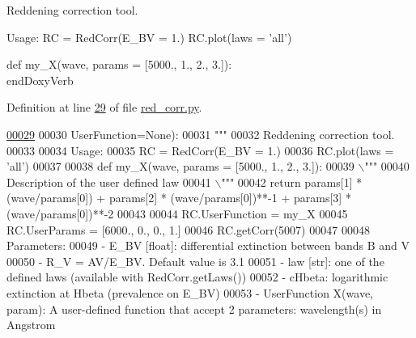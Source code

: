 \begin{DoxyVerb}Reddening correction tool.

Usage:
    RC = RedCorr(E_BV = 1.)
    RC.plot(laws = 'all')

    def my_X(wave, params = [5000., 1., 2., 3.]):
\\end{DoxyVerb}
 

Definition at line \hyperlink{red__corr_8py_source_l00029}{29} of file \hyperlink{red__corr_8py_source}{red\-\_\-corr.\-py}.


\begin{DoxyCode}
\hypertarget{classpyneb_1_1extinction_1_1red__corr_1_1_red_corr_l00029}{}\hyperlink{classpyneb_1_1extinction_1_1red__corr_1_1_red_corr_a27b836e3bd87558f6156a8bf94fbf658}{00029} 
00030                  UserFunction=\textcolor{keywordtype}{None}):
00031         \textcolor{stringliteral}{"""}
00032 \textcolor{stringliteral}{        Reddening correction tool.}
00033 \textcolor{stringliteral}{}
00034 \textcolor{stringliteral}{        Usage:}
00035 \textcolor{stringliteral}{            RC = RedCorr(E\_BV = 1.)}
00036 \textcolor{stringliteral}{            RC.plot(laws = 'all')}
00037 \textcolor{stringliteral}{}
00038 \textcolor{stringliteral}{            def my\_X(wave, params = [5000., 1., 2., 3.]):}
00039 \textcolor{stringliteral}{                \(\backslash\)"""}
00040 \textcolor{stringliteral}{                Description of the user defined law}
00041 \textcolor{stringliteral}{                \(\backslash\)"""}
00042 \textcolor{stringliteral}{                return params[1] * (wave/params[0]) + params[2] * (wave/params[0])**-1 + params[3] *
       (wave/params[0])**-2}
00043 \textcolor{stringliteral}{}
00044 \textcolor{stringliteral}{            RC.UserFunction = my\_X}
00045 \textcolor{stringliteral}{            RC.UserParams = [6000., 0., 0., 1.]}
00046 \textcolor{stringliteral}{            RC.getCorr(5007)}
00047 \textcolor{stringliteral}{        }
00048 \textcolor{stringliteral}{        Parameters:}
00049 \textcolor{stringliteral}{            - E\_BV [float]: differential extinction between bands B and V}
00050 \textcolor{stringliteral}{            - R\_V = AV/E\_BV. Default value is 3.1}
00051 \textcolor{stringliteral}{            - law [str]: one of the defined laws (available with RedCorr.getLaws()) }
00052 \textcolor{stringliteral}{            - cHbeta: logarithmic extinction at Hbeta (prevalence on E\_BV)}
00053 \textcolor{stringliteral}{            - UserFunction X(wave, param): A user-defined function that accept 2 parameters: wavelength(s)
       in Angstrom }

\end{DoxyCode}
\end{DoxyVerb}
